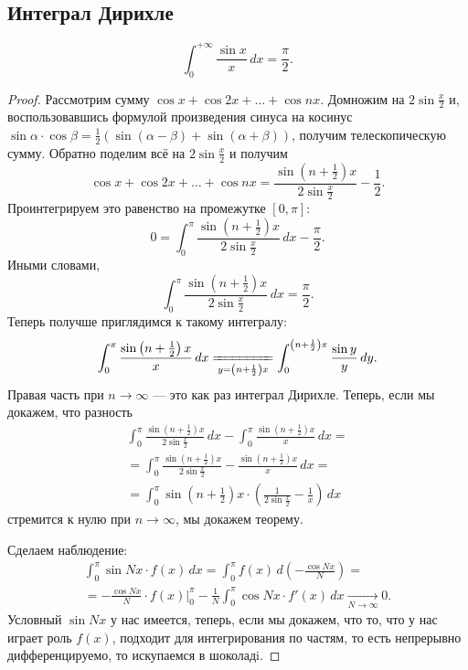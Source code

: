\subsection{Интеграл Дирихле}

\begin{theorem}
	\[
		\int_{0}^{+\infty} \frac{\sin x}{x} \, dx = \frac{\pi}{2}.
	\]
\end{theorem}
\begin{proof}
	Рассмотрим сумму \(\cos x + \cos 2x + \ldots + \cos nx\). Домножим на \(2 \sin \frac{x}{2}\) и, воспользовавшись формулой произведения синуса на косинус \(\sin \alpha \cdot \cos \beta = \frac{1}{2} (\sin(\alpha - \beta) + \sin(\alpha + \beta))\), получим телескопическую сумму. Обратно поделим всё на \(2 \sin \frac{x}{2}\) и получим \[
		\cos x + \cos 2x + \ldots + \cos nx = \frac{\sin \left(n + \frac{1}{2} \right)x}{2 \sin \frac{x}{2}} - \frac{1}{2}.
	\]
	Проинтегрируем это равенство на промежутке  \([0, \pi]\): \[
		0 = \int_{0}^{\pi} \frac{\sin \left(n + \frac{1}{2} \right)x}{2 \sin \frac{x}{2}} \, dx - \frac{\pi}{2}.
	\]
	Иными словами, \[
		\int_{0}^{\pi} \frac{\sin \left(n + \frac{1}{2} \right)x}{2 \sin \frac{x}{2}} \, dx = \frac{\pi}{2}.
	\]
	Теперь получше приглядимся к такому интегралу: \[
		\int_{0}^{\pi} \frac{\sin \left(n + \frac{1}{2} \right)x}{x} \, dx \xlongequal[y = \left(n + \frac{1}{2} \right)x]{} \int_{0}^{\left(n + \frac{1}{2} \right)\pi} \frac{\sin y}{y} \, dy.
	\]
	Правая часть при  \(n \to \infty\) --- это как раз интеграл Дирихле.
	Теперь, если мы докажем, что разность
	\begin{multline*}
		\int_{0}^{\pi} \frac{\sin \left(n + \frac{1}{2} \right)x}{2 \sin \frac{x}{2}} \, dx - \int_{0}^{\pi} \frac{\sin \left(n + \frac{1}{2} \right)x}{x} \, dx = \\
		= \int_{0}^{\pi} \frac{\sin \left(n + \frac{1}{2} \right)x}{2 \sin \frac{x}{2}} - \frac{\sin \left(n + \frac{1}{2} \right)x}{x} \, dx = \\
		= \int_{0}^{\pi} \sin \left(n + \tfrac{1}{2} \right)x \cdot \left(\frac{1}{2 \sin \frac{x}{2}} - \frac{1}{x}\right) \, dx
	\end{multline*}
	стремится к нулю при \(n \to \infty\), мы докажем теорему.
	
	Сделаем наблюдение: 
	\begin{multline*}
		\int_{0}^{\pi} \sin Nx \cdot f(x) \, dx = \int_{0}^{\pi} f(x) \, d\left(-\frac{\cos Nx}{N} \right) = \\
		= -\frac{\cos Nx}{N} \cdot f(x) \bigg|_{0}^{\pi}  - \frac{1}{N} \int_{0}^{\pi} \cos Nx \cdot f'(x) \, dx \xrightarrow[N \to \infty]{} 0.
	\end{multline*}
	Условный \(\sin Nx\) у нас имеется, теперь, если мы докажем, что то, что у нас играет роль \(f(x)\), подходит для интегрирования по частям, то есть непрерывно дифференцируемо, то искупаемся в шоколадi.
	

\end{proof}

